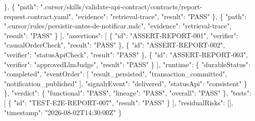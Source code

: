 \documentclass[
  10pt,
  a4paper,
  oneside]{book}
\newenvironment{Shaded}{}{}
\newcommand{\DataTypeTok}[1]{\textcolor[rgb]{0.56,0.13,0.00}{#1}}
\newcommand{\FunctionTok}[1]{\textcolor[rgb]{0.02,0.16,0.49}{#1}}
\newcommand{\OtherTok}[1]{\textcolor[rgb]{0.00,0.44,0.13}{#1}}
\newcommand{\StringTok}[1]{\textcolor[rgb]{0.25,0.44,0.63}{#1}}
\renewenvironment{Shaded}{\begin{snugshade}}{\end{snugshade}}%
\begin{document}
\begin{Shaded}
\begin{Highlighting}[]
      \FunctionTok{\}}\OtherTok{,}
      \FunctionTok{\{}
        \DataTypeTok{"path"}\FunctionTok{:} \StringTok{".cursor/skills/validate{-}api{-}contract/contracts/report{-}request.contract.yaml"}\FunctionTok{,}
        \DataTypeTok{"evidence"}\FunctionTok{:} \StringTok{"retrieval{-}trace"}\FunctionTok{,}
        \DataTypeTok{"result"}\FunctionTok{:} \StringTok{"PASS"}
      \FunctionTok{\}}\OtherTok{,}
      \FunctionTok{\{}
        \DataTypeTok{"path"}\FunctionTok{:} \StringTok{".cursor/rules/persistir{-}antes{-}de{-}notificar.mdc"}\FunctionTok{,}
        \DataTypeTok{"evidence"}\FunctionTok{:} \StringTok{"retrieval{-}trace"}\FunctionTok{,}
        \DataTypeTok{"result"}\FunctionTok{:} \StringTok{"PASS"}
      \FunctionTok{\}}
    \OtherTok{]}\FunctionTok{,}
    \DataTypeTok{"assertions"}\FunctionTok{:} \OtherTok{[}
      \FunctionTok{\{}
        \DataTypeTok{"id"}\FunctionTok{:} \StringTok{"ASSERT{-}REPORT{-}001"}\FunctionTok{,}
        \DataTypeTok{"verifier"}\FunctionTok{:} \StringTok{"causalOrderCheck"}\FunctionTok{,}
        \DataTypeTok{"result"}\FunctionTok{:} \StringTok{"PASS"}
      \FunctionTok{\}}\OtherTok{,}
      \FunctionTok{\{}
        \DataTypeTok{"id"}\FunctionTok{:} \StringTok{"ASSERT{-}REPORT{-}002"}\FunctionTok{,}
        \DataTypeTok{"verifier"}\FunctionTok{:} \StringTok{"statusApiCheck"}\FunctionTok{,}
        \DataTypeTok{"result"}\FunctionTok{:} \StringTok{"PASS"}
      \FunctionTok{\}}\OtherTok{,}
      \FunctionTok{\{}
        \DataTypeTok{"id"}\FunctionTok{:} \StringTok{"ASSERT{-}REPORT{-}003"}\FunctionTok{,}
        \DataTypeTok{"verifier"}\FunctionTok{:} \StringTok{"approvedLlmJudge"}\FunctionTok{,}
        \DataTypeTok{"result"}\FunctionTok{:} \StringTok{"PASS"}
      \FunctionTok{\}}
    \OtherTok{]}\FunctionTok{,}
    \DataTypeTok{"runtime"}\FunctionTok{:} \FunctionTok{\{}
      \DataTypeTok{"durableStatus"}\FunctionTok{:} \StringTok{"completed"}\FunctionTok{,}
      \DataTypeTok{"eventOrder"}\FunctionTok{:} \OtherTok{[}
        \StringTok{"result\_persisted"}\OtherTok{,}
        \StringTok{"transaction\_committed"}\OtherTok{,}
        \StringTok{"notification\_published"}
      \OtherTok{]}\FunctionTok{,}
      \DataTypeTok{"signalrEvent"}\FunctionTok{:} \StringTok{"delivered"}\FunctionTok{,}
      \DataTypeTok{"statusApi"}\FunctionTok{:} \StringTok{"consistent"}
    \FunctionTok{\}}
  \FunctionTok{\},}
  \DataTypeTok{"verdict"}\FunctionTok{:} \FunctionTok{\{}
    \DataTypeTok{"functional"}\FunctionTok{:} \StringTok{"PASS"}\FunctionTok{,}
    \DataTypeTok{"lineage"}\FunctionTok{:} \StringTok{"PASS"}\FunctionTok{,}
    \DataTypeTok{"overall"}\FunctionTok{:} \StringTok{"PASS"}
  \FunctionTok{\},}
  \DataTypeTok{"tests"}\FunctionTok{:} \OtherTok{[}
    \FunctionTok{\{}
      \DataTypeTok{"id"}\FunctionTok{:} \StringTok{"TEST{-}E2E{-}REPORT{-}007"}\FunctionTok{,}
      \DataTypeTok{"result"}\FunctionTok{:} \StringTok{"PASS"}
    \FunctionTok{\}}
  \OtherTok{]}\FunctionTok{,}
  \DataTypeTok{"residualRisks"}\FunctionTok{:} \OtherTok{[]}\FunctionTok{,}
  \DataTypeTok{"timestamp"}\FunctionTok{:} \StringTok{"2026{-}08{-}02T14:30:00Z"}
\FunctionTok{\}}
\end{Highlighting}
\end{Shaded}
\end{document}
